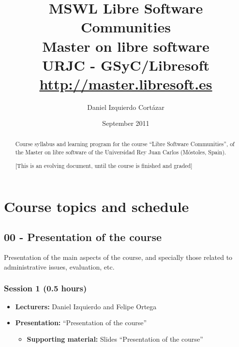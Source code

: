 \documentclass[a4paper]{article}
\title{MSWL Libre Software Communities \\
Master on libre software \\
URJC - GSyC/Libresoft \\
\url{http://master.libresoft.es}}
\author{Daniel Izquierdo Cortázar}
\date{September 2011}
\begin{document}
\maketitle

\begin{abstract}
Course syllabus and learning program for the course ``Libre Software Communities'', 
of the Master on libre software of the Universidad Rey Juan Carlos (Móstoles, Spain).

[This is an evolving document, until the course is finished and graded]
\end{abstract}

\tableofcontents

\section{Course topics and schedule}

\subsection{00 - Presentation of the course}

Presentation of the main aspects of the course, and specially those related to administrative issues, evaluation, etc.

\subsubsection{Session 1 (0.5 hours)}

\begin{itemize}
\item \textbf{Lecturers:} Daniel Izquierdo and Felipe Ortega
\item \textbf{Presentation:} ``Presentation of the course''
  \begin{itemize}
  \item \textbf{Supporting material:} Slides ``Presentation of the course''
  \end{itemize}
\end{itemize}

\end{document}
